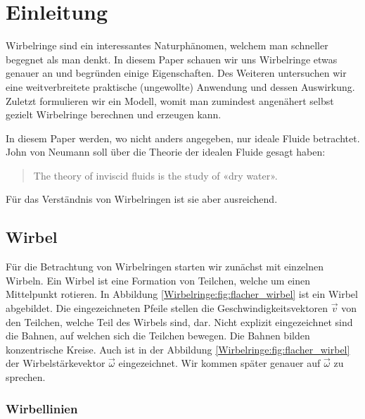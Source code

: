%
%
%
\section{Einleitung}

Wirbelringe sind ein interessantes Naturphänomen, welchem man schneller begegnet als man denkt. 
In diesem Paper schauen wir uns Wirbelringe etwas genauer an und begründen einige Eigenschaften. 
Des Weiteren untersuchen wir eine weitverbreitete praktische (ungewollte) Anwendung und dessen Auswirkung. 
Zuletzt formulieren wir ein Modell, womit man zumindest angenähert selbst gezielt Wirbelringe berechnen und erzeugen kann.

In diesem Paper werden, wo nicht anders angegeben, nur ideale Fluide betrachtet.
John von Neumann soll über die Theorie der idealen Fluide gesagt haben\cite{Wirbelringe:feynman1964lectures}: 

\begin{quote}
    The theory of inviscid fluids is the study of «dry water».
\end{quote}

Für das Verständnis von Wirbelringen ist sie aber ausreichend.

\subsection{Wirbel}



Für die Betrachtung von Wirbelringen starten wir zunächst mit einzelnen Wirbeln.
Ein Wirbel ist eine Formation von Teilchen, welche um einen Mittelpunkt rotieren.
In Abbildung \ref{Wirbelringe:fig:flacher_wirbel} ist ein Wirbel abgebildet.
Die eingezeichneten Pfeile stellen die Geschwindigkeitsvektoren \( \vec{v} \) von den Teilchen, welche Teil des Wirbels sind, dar.
Nicht explizit eingezeichnet sind die Bahnen, auf welchen sich die Teilchen bewegen.
Die Bahnen bilden konzentrische Kreise.
Auch ist in der Abbildung \ref{Wirbelringe:fig:flacher_wirbel} der Wirbelstärkevektor \(\vec{\omega}\) eingezeichnet.
Wir kommen später genauer auf \(\vec{\omega}\) zu sprechen.

\subsubsection*{Wirbellinien\label{Wirbelringe:Wirbellinien}}

